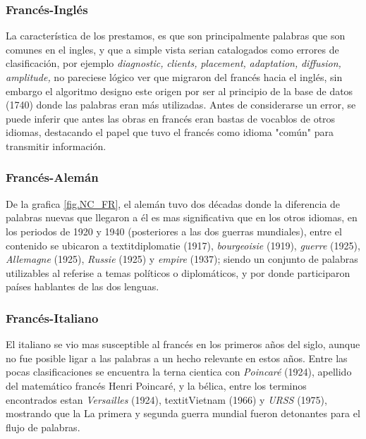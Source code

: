 \subsubsection*{Francés-Inglés}%

La característica de los prestamos, es que son principalmente palabras que son comunes en el ingles, y que a simple vista serian catalogados como errores de clasificación, por ejemplo  \textit{diagnostic,} \textit{clients,} \textit{placement,} \textit{adaptation,} \textit{diffusion,} \textit{amplitude,} no pareciese lógico ver que migraron del francés hacia el inglés, sin embargo el algoritmo designo este origen por ser al principio de la base de datos (1740)  donde las palabras eran más utilizadas.  Antes de considerarse un error, se puede inferir que antes las obras en francés eran bastas de vocablos de otros idiomas, destacando el papel que tuvo el francés como idioma "común" para transmitir información. 


\subsubsection*{Francés-Alemán}%

De la grafica \ref{fig.NC_FR}, el alemán tuvo dos décadas donde la diferencia de palabras nuevas que llegaron a él es mas significativa que en los otros idiomas, en los periodos de 1920 y 1940  (posteriores a las dos guerras mundiales), entre el contenido se ubicaron a  textit{diplomatie} (1917), \textit{bourgeoisie} (1919),  \textit{guerre} (1925), \textit{Allemagne} (1925), \textit{Russie} (1925) y \textit{empire} (1937); siendo un conjunto de palabras utilizables al referise a temas políticos  o diplomáticos, y por donde participaron países hablantes de las dos lenguas. 


\subsubsection*{Francés-Italiano}%

El italiano se vio mas susceptible al francés en los primeros años del siglo, aunque no fue posible ligar a las palabras a un hecho relevante en estos años. Entre las pocas clasificaciones se encuentra la terna cientica con \textit{Poincaré} (1924), apellido del matemático francés Henri Poincaré, y la bélica,  entre los terminos encontrados estan \textit{Versailles} (1924), textit{Vietnam} (1966)  y \textit{URSS} (1975), mostrando que la  La primera y segunda guerra mundial fueron detonantes para el flujo de palabras.


